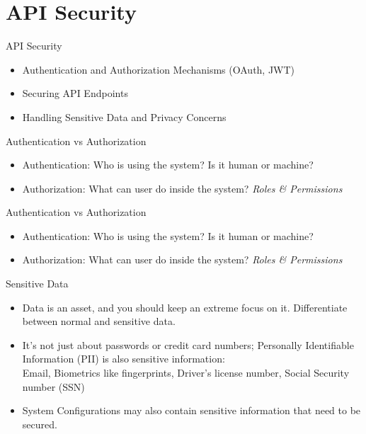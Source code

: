 \documentclass{beamer}
\begin{document}
\section{API Security}
\begin{frame}{API Security}
  \begin{itemize}
    \item Authentication and Authorization Mechanisms (OAuth, JWT)
    \item Securing API Endpoints
    \item Handling Sensitive Data and Privacy Concerns
  \end{itemize}
\end{frame}

\begin{frame}[t]{Authentication vs Authorization}
  \begin{itemize}
  	\small
    \item Authentication: Who is using the system? Is it human or machine?
    \item Authorization: What can user do inside the system? \textit{Roles \& Permissions}
  \end{itemize}
\end{frame}

\begin{frame}[t]{Authentication vs Authorization}
  \begin{itemize}
  	\small
    \item Authentication: Who is using the system? Is it human or machine?
    \item Authorization: What can user do inside the system? \textit{Roles \& Permissions}
  \end{itemize}
  
  \begin{block}{Sensitive Data}
    \scriptsize
    \begin{itemize}
		\item Data is an asset, and you should keep an extreme focus on it. Differentiate between normal and sensitive data. 
		\item It's not just about passwords or credit card numbers; Personally Identifiable Information (PII) is also sensitive information: \\ 
  			Email, Biometrics like fingerprints, Driver's license number, Social Security number (SSN) \\
  	
  		\item System Configurations may also contain sensitive information that need to be secured.
  	\end{itemize}
  \end{block}
  
\end{frame}
\end{document}
